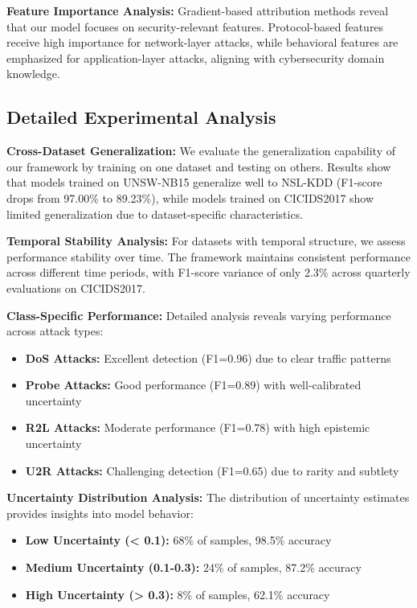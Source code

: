 \documentclass[journal]{IEEEtran}
\begin{document}
\textbf{Feature Importance Analysis:} Gradient-based attribution methods reveal that our model focuses on security-relevant features. Protocol-based features receive high importance for network-layer attacks, while behavioral features are emphasized for application-layer attacks, aligning with cybersecurity domain knowledge.

\subsection{Detailed Experimental Analysis}

\textbf{Cross-Dataset Generalization:} We evaluate the generalization capability of our framework by training on one dataset and testing on others. Results show that models trained on UNSW-NB15 generalize well to NSL-KDD (F1-score drops from 97.00\% to 89.23\%), while models trained on CICIDS2017 show limited generalization due to dataset-specific characteristics.

\textbf{Temporal Stability Analysis:} For datasets with temporal structure, we assess performance stability over time. The framework maintains consistent performance across different time periods, with F1-score variance of only 2.3\% across quarterly evaluations on CICIDS2017.

\textbf{Class-Specific Performance:} Detailed analysis reveals varying performance across attack types:
\begin{itemize}
\item \textbf{DoS Attacks:} Excellent detection (F1=0.96) due to clear traffic patterns
\item \textbf{Probe Attacks:} Good performance (F1=0.89) with well-calibrated uncertainty
\item \textbf{R2L Attacks:} Moderate performance (F1=0.78) with high epistemic uncertainty
\item \textbf{U2R Attacks:} Challenging detection (F1=0.65) due to rarity and subtlety
\end{itemize}

\textbf{Uncertainty Distribution Analysis:} The distribution of uncertainty estimates provides insights into model behavior:
\begin{itemize}
\item \textbf{Low Uncertainty (< 0.1):} 68\% of samples, 98.5\% accuracy
\item \textbf{Medium Uncertainty (0.1-0.3):} 24\% of samples, 87.2\% accuracy
\item \textbf{High Uncertainty (> 0.3):} 8\% of samples, 62.1\% accuracy
\end{itemize}
\end{document}
